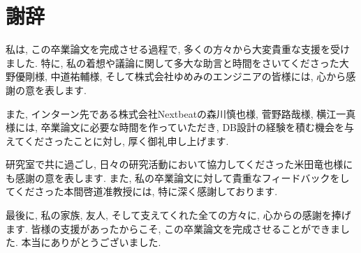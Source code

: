 \documentclass[../../main]{subfiles}
\begin{document}
    \section{謝辞}\label{sec:acknowledgment}

    私は, この卒業論文を完成させる過程で, 多くの方々から大変貴重な支援を受けました. 特に, 私の着想や議論に関して多大な助言と時間をさいてくださった大野優剛様, 中道祐輔様, そして株式会社ゆめみのエンジニアの皆様には, 心から感謝の意を表します.

    また, インターン先である株式会社Nextbeatの森川慎也様, 菅野路哉様, 横江一真様には, 卒業論文に必要な時間を作っていただき, DB設計の経験を積む機会を与えてくださったことに対し, 厚く御礼申し上げます.

    研究室で共に過ごし, 日々の研究活動において協力してくださった米田竜也様にも感謝の意を表します. また, 私の卒業論文に対して貴重なフィードバックをしてくださった本間啓道准教授には, 特に深く感謝しております.

    最後に, 私の家族, 友人, そして支えてくれた全ての方々に, 心からの感謝を捧げます. 皆様の支援があったからこそ, この卒業論文を完成させることができました. 本当にありがとうございました.

    \clearpage
\end{document}

